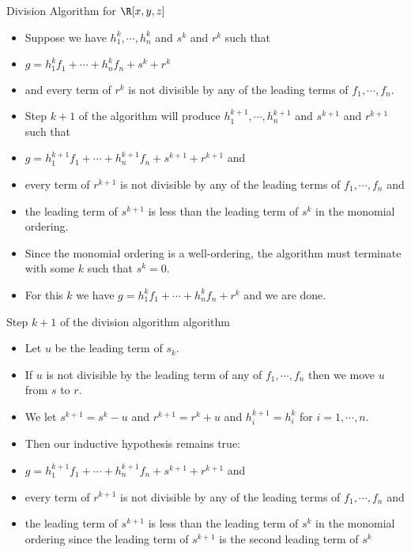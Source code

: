 \documentclass{beamer}
\begin{document}
\begin{frame}{Division Algorithm for $\R[x,y,z]$}

\begin{itemize}
  \item Suppose we have $h_1^k, \cdots, h_n^k$ and $s^k$ and $r^k$ such that
  \item $g = h_1^k f_1 + \cdots + h_n^k f_n + s^k + r^k$
  \item and every term of $r^k$ is not divisible by any of the leading terms of $f_1,\cdots, f_n$.
  \item Step $k+1$ of the algorithm will produce $h_1^{k+1} , \cdots,  h_n^{k+1}$ and $s^{k+1}$ and $r^{k+1}$ such that
  \item $g = h_1^{k+1} f_1 + \cdots + h_n^{k+1} f_n + s^{k+1} + r^{k+1}$ and
  \item every term of $r^{k+1}$ is not divisible by any of the leading terms of $f_1,\cdots, f_n$ and
  \item the leading term of $s^{k+1}$ is less than the leading term of $s^k$ in the monomial ordering.
  \item Since the monomial ordering is a well-ordering, the algorithm must terminate with some $k$ such that $s^k = 0$.
  \item For this $k$ we have $g = h_1^k f_1 + \cdots + h_n^k f_n + r^k$ and we are done.
\end{itemize}

\end{frame}

\begin{frame}{Step $k+1$ of the division algorithm algorithm}

\begin{itemize}
  \item Let $u$ be the leading term of $s_k$.
  \item If $u$ is not divisible by the leading term of any of $f_1,\cdots,f_n$ then we move $u$ from $s$ to $r$.
  \item We let $s^{k+1} = s^k - u$ and $r^{k+1} = r^k + u$ and $h_i^{k+1} = h_i^k$ for $i=1,\cdots,n$.
  \item Then our inductive hypothesis remains true:
  \item $g = h_1^{k+1} f_1 + \cdots + h_n^{k+1} f_n + s^{k+1} + r^{k+1}$ and
  \item every term of $r^{k+1}$ is not divisible by any of the leading terms of $f_1,\cdots, f_n$ and
  \item the leading term of $s^{k+1}$ is less than the leading term of $s^k$ in the monomial ordering since the leading
  term of $s^{k+1}$ is the second leading term of $s^k$
\end{itemize}

\end{frame}
\end{document}
